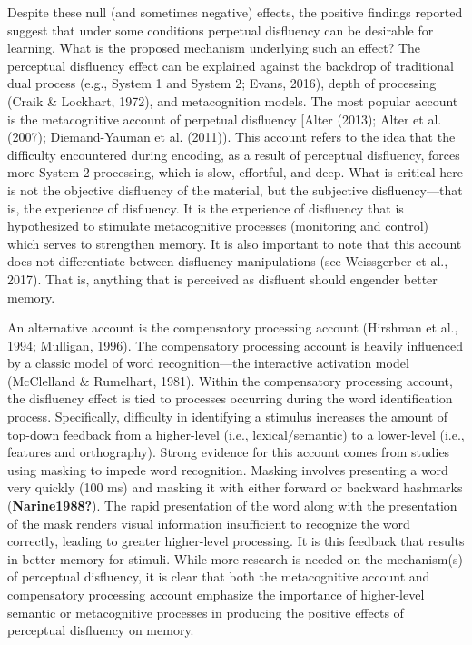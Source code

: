 \documentclass[
  english,
  jou]{apa7}
\begin{document}
Despite these null (and sometimes negative) effects, the positive findings reported suggest that under some conditions perpetual disfluency can be desirable for learning. What is the proposed mechanism underlying such an effect? The perceptual disfluency effect can be explained against the backdrop of traditional dual process (e.g., System 1 and System 2; Evans, 2016), depth of processing (Craik \& Lockhart, 1972), and metacognition models. The most popular account is the metacognitive account of perpetual disfluency {[}Alter (2013); Alter et al. (2007); Diemand-Yauman et al. (2011)). This account refers to the idea that the difficulty encountered during encoding, as a result of perceptual disfluency, forces more System 2 processing, which is slow, effortful, and deep. What is critical here is not the objective disfluency of the material, but the subjective disfluency---that is, the experience of disfluency. It is the experience of disfluency that is hypothesized to stimulate metacognitive processes (monitoring and control) which serves to strengthen memory. It is also important to note that this account does not differentiate between disfluency manipulations (see Weissgerber et al., 2017). That is, anything that is perceived as disfluent should engender better memory.

An alternative account is the compensatory processing account (Hirshman et al., 1994; Mulligan, 1996). The compensatory processing account is heavily influenced by a classic model of word recognition---the interactive activation model (McClelland \& Rumelhart, 1981). Within the compensatory processing account, the disfluency effect is tied to processes occurring during the word identification process. Specifically, difficulty in identifying a stimulus increases the amount of top-down feedback from a higher-level (i.e., lexical/semantic) to a lower-level (i.e., features and orthography). Strong evidence for this account comes from studies using masking to impede word recognition. Masking involves presenting a word very quickly (100 ms) and masking it with either forward or backward hashmarks (\textbf{Narine1988?}). The rapid presentation of the word along with the presentation of the mask renders visual information insufficient to recognize the word correctly, leading to greater higher-level processing. It is this feedback that results in better memory for stimuli. While more research is needed on the mechanism(s) of perceptual disfluency, it is clear that both the metacognitive account and compensatory processing account emphasize the importance of higher-level semantic or metacognitive processes in producing the positive effects of perceptual disfluency on memory.
\end{document}
